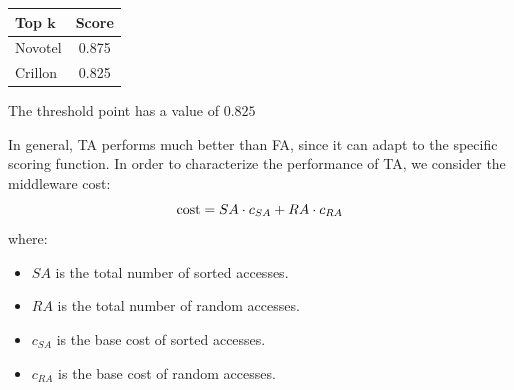 \documentclass[12pt, a4paper]{report}
\newtheorem[style=M,bodystyle=\normalfont]{theorem}{Theorem}
\newtheorem[style=M,bodystyle=\normalfont]{corollary}{Corollary}
\newtheorem[style=M,bodystyle=\normalfont]{lemma}{Lemma}
\newtheorem[style=M,bodystyle=\normalfont]{definition}{Definition}
\begin{document}
\begin{example}
        \begin{table}[H]
            \centering
            \begin{tabular}{|lc|}
            \hline
            \textbf{Top $\boldsymbol{k}$} & \textbf{Score} \\ \hline
            Novotel                       & 0.875          \\ 
            Crillon                       & 0.825          \\ \hline
            \end{tabular}
        \end{table}
        The threshold point has a value of $0.825$
    \end{example}
    In general, TA performs much better than FA, since it can adapt to the specific scoring function. In order to characterize the 
    performance of TA, we consider the middleware cost: 
    \[\textnormal{cost} = SA \cdot c_{SA} + RA \cdot c_{RA}\]
    where:
    \begin{itemize}
        \item $SA$ is the total number of sorted accesses.
        \item $RA$ is the total number of random accesses.
        \item $c_{SA}$ is the base cost of sorted accesses.
        \item $c_{RA}$ is the base cost of random accesses.
    \end{itemize}
\end{document}
